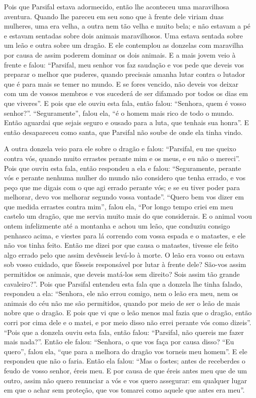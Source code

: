 Pois que Parsifal estava adormecido, então lhe aconteceu uma maravilhosa
aventura. Quando lhe pareceu em seu sono que à frente dele viriam duas
mulheres, uma era velha, a outra nem tão velha e muito bela; e não estavam a pé
e estavam sentadas sobre dois animais maravilhosos. Uma estava sentada sobre um
leão e outra sobre um dragão. E ele contemplou as donzelas com maravilha por
causa de assim poderem dominar os dois animais. E a mais jovem veio à frente e
falou: “Parsifal, meu senhor vos faz saudação e vos pede que deveis vos
preparar  o melhor que puderes, quando precisais amanha lutar contra o lutador
que é para mais se temer no mundo. E se fores vencido, não deveis vos deixar
com um de vossos membros e vos sucederá de ser difamado por todos os dias em
que viveres”. E pois que ele ouviu esta fala, então falou: “Senhora, quem é
vosso senhor?”. “Seguramente”, falou ela, “é o homem mais rico de todo o mundo.
Então aguardai que sejais seguro e ousado para a luta, que tenhais sua honra”.
E então desapareceu como santa, que Parsifal não soube de onde ela tinha
vindo.

A outra donzela veio para ele sobre o dragão e falou: “Parsifal, eu me
queixo contra vós, quando muito errastes perante mim e os meus, e eu não o
mereci”. Pois que ouviu esta fala, então respondeu a ela e falou: “Seguramente,
perante vós e perante nenhuma mulher do mundo não considero que tenha errado, e
vos peço que me digais com o que agi errado perante vós; e se eu tiver poder
para melhorar, devo vos melhorar segundo vossa vontade”. “Quero bem vos dizer
em que medida errastes contra mim”, falou ela, “Por longo tempo criei em meu
castelo um dragão, que me servia muito mais do que considerais. E o animal voou
ontem infelizmente até a montanha e achou um leão, que conduziu consigo
penhasco acima, e viestes para lá correndo com vossa espada e o matastes, e ele
não vos tinha feito. Então me dizei por que causa o matastes, tivesse ele feito
algo errado pelo que assim devêsseis levá-lo à morte. O leão era vosso ou
estava sob vosso cuidado, que fôsseis responsável por lutar à frente dele?
São-vos assim permitidos os animais, que deveis matá-los sem direito? Sois
assim tão grande cavaleiro?”. Pois que Parsifal entendeu esta
fala que a donzela lhe tinha falado, respondeu a ela: “Senhora, ele não errou
comigo, nem o leão era meu, nem os animais do céu não me são permitidos, quando
por meio de ser o leão de mais nobre que o dragão. E pois que vi que o leão
menos mal fazia que o dragão, então corri por cima dele e o matei, e por meio
disso não errei perante vós como dizeis”. “Pois que a donzela ouviu esta fala,
então falou: “Parsifal, não quereis me fazer mais nada?”. Então ele falou:
“Senhora, o que vos faça por causa disso? “Eu quero”, falou ela, “que para a
melhora do dragão vos torneis meu homem”. E ele respondeu que não o faria.
Então ela falou: “Mas o fostes; antes de receberdes o feudo de vosso senhor,
éreis meu. E por causa de que éreis antes meu que de um outro, assim não quero
renunciar a vós e vos quero assegurar: em qualquer lugar em que o achar sem
proteção, que vos tomarei como aquele que antes era meu”. 

